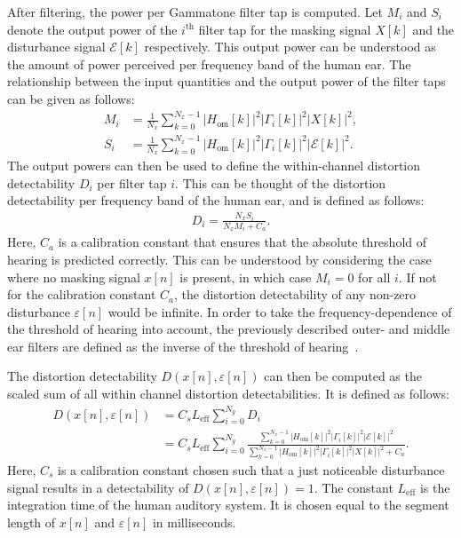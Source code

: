 After filtering, the power per Gammatone filter tap is computed.
Let $M_i$ and $S_i$ denote the output power of the $i^\text{th}$ filter tap for the masking signal $X[k]$ and 
the disturbance signal $\mathcal{E}[k]$ respectively.
This output power can be understood as the amount of power perceived per frequency band of the human ear. 
The relationship between the input quantities and the output power of the filter taps can be given as follows:
\begin{align}
    M_i &= \frac{1}{N_x}\sum_{k=0}^{N_x-1}\left|H_\text{om}[k]\right|^2\left|\Gamma_i[k]\right|^2\left|X[k]\right|^2, \\
    S_i &= \frac{1}{N_x}\sum_{k=0}^{N_x-1}\left|H_\text{om}[k]\right|^2\left|\Gamma_i[k]\right|^2\left|\mathcal{E}[k]\right|^2. 
\end{align}
The output powers can then be used to define the within-channel distortion detectability $D_i$ per filter tap $i$.
This can be thought of the distortion detectability per frequency band of the human ear, and is defined as follows:
\begin{align}
    D_i = \frac{N_xS_i}{N_xM_i + C_a}.
\end{align}
Here, $C_a$ is a calibration constant that ensures that the absolute threshold of hearing is predicted correctly.
This can be understood by considering the case where no masking signal $x[n]$ is present, 
in which case $M_i = 0$ for all $i$.
If not for the calibration constant $C_a$, the distortion detectability of any non-zero disturbance
$\varepsilon[n]$ would be infinite.
In order to take the frequency-dependence of the threshold of hearing into account, the previously described outer- and middle ear filters are defined as the inverse of the threshold of hearing~\cite{van2005perceptual}.

The distortion detectability $D(x[n],\varepsilon[n])$ can then be computed as the scaled sum of all 
within channel distortion detectabilities.
It is defined as follows:
\begin{align}
    D(x[n],\varepsilon[n]) &= C_s L_\text{eff}\sum_{i=0}^{N_g} D_i \\
                        &= C_s L_\text{eff}\sum_{i=0}^{N_g} 
                        \frac{\sum_{k=0}^{N_x-1}\left|H_\text{om}[k]\right|^2\left|
                            \Gamma_i[k]\right|^2\left|\mathcal{E}[k]\right|^2}
                        {\sum_{k=0}^{N_x-1}\left|H_\text{om}[k]\right|^2\left|
                            \Gamma_i[k]\right|^2\left|X[k]\right|^2 + C_a}.
    \label{eq:perceptual:implementation:computation:detectability}
\end{align}
Here, $C_s$ is a calibration constant chosen such that a just noticeable disturbance signal results in a 
detectability of $D(x[n],\varepsilon[n]) = 1$. 
The constant $L_\text{eff}$ is the integration time of the human auditory system.
It is chosen equal to the segment length of $x[n]$ and $\varepsilon[n]$ in milliseconds.  

